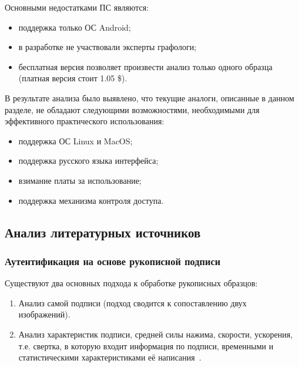 Основными недостатками ПС являются:
\begin{itemize}
  \item поддержка только ОС Android;
  \item в разработке не участвовали эксперты графологи;
  \item бесплатная версия позволяет произвести анализ только одного образца (платная версия стоит 1.05 \$).
\end{itemize}

В результате анализа было выявлено, что текущие аналоги, описанные в данном разделе, не обладают следующими возможностями, необходимыми для эффективного практического использования:
\begin{itemize}
  \item поддержка ОС Linux и MacOS;
  \item поддержка русского языка интерфейса;
  \item взимание платы за использование;
  \item поддержка механизма контроля доступа.
\end{itemize}

\subsection{Анализ литературных источников}
\label{sub:domain:literary_sources}

\subsubsection{Аутентификация на основе рукописной подписи}
Существуют два основных подхода к обработке рукописных образцов:
\begin{enumerate}
  \item Анализ самой подписи (подход сводится к сопоставлению двух изображений).
  \item Анализ характеристик подписи, средней силы нажима, скорости, ускорения, т.е. свертка, в которую входит информация по подписи, временными и статистическими характеристиками её написания~\cite{bryxomickii}.
\end{enumerate}

